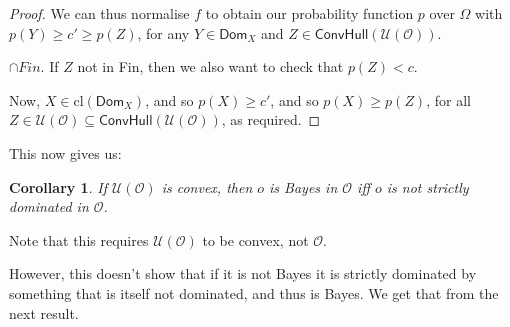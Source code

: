\documentclass[a4paper]{article}
\newtheorem{corollary}[theorem]{Corollary}
\newcommand\cl{\mathrm{cl}}
\renewcommand\O{\mathcal{O}}
\newcommand\Uwald{\mathcal{U}} %
\newcommand{\Dom}{\mathsf{Dom}}
\newcommand{\todoold}[2][]{\todo[backgroundcolor=white,bordercolor=orange!10,linecolor=gray!10, #1,caption={},textcolor=gray]{Pre-rev: #2}}
\newcommand{\Conv}{\mathsf{ConvHull}}
\renewcommand{\geq}{\geqslant}
\newenvironment{CCM rewritten}
{\begingroup\color{blue}} %
{\endgroup}              %
\begin{document}
\begin{proof}
		
		We can thus normalise $f$ to obtain our probability function $p$ over $\Omega$ with $p(Y)\geq c' \geq p(Z)$, for any $Y\in \Dom_X $ and $Z\in \Conv(\Uwald(\O))$.\begin{infversion}
			$\cap Fin$. If $Z$ not in Fin, then we also want to check that $p(Z)<c$. 
		\end{infversion}
		
		Now, $X\in\cl(\Dom_X )$, and so $p(X)\geq c'$, and so $p(X) \geq p(Z)$, for all $Z\in \Uwald(\O)\subseteq \Conv(\Uwald(\O))$, as required.
	\end{proof}
	
		This now gives us:
	\begin{corollary}
		If $\Uwald(\O)$ is convex, then 
		$o$ is Bayes in $\O$ iff $o$ is not strictly dominated in $\O$.
	\end{corollary}
	Note that this requires $\Uwald(\O)$ to be convex, not $\O$.
	
	However, this doesn't show that if it is not Bayes it is strictly dominated by something that is itself not dominated, and thus is Bayes. We get that from the next result. 
	
	
\end{document}
